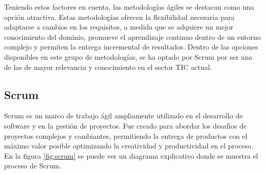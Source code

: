 


Teniendo estos factores en cuenta, las metodologías ágiles se destacan como una opción atractiva. Estas metodologías ofrecen la flexibilidad necesaria para adaptarse a cambios en los requisitos, a medida que se adquiere un mejor conocimiento del dominio, promueve el aprendizaje continuo dentro de un entorno complejo y permiten la entrega incremental de resultados. Dentro de las opciones disponibles en este grupo de metodologías, se ha optado por Scrum \cite{scrum} por ser una de las de mayor relevancia y conocimiento en el sector TIC actual.

\subsection{Scrum}

Scrum es un marco de trabajo ágil ampliamente utilizado en el desarrollo de software y en la gestión de proyectos. Fue creado para abordar los desafíos de proyectos complejos y cambiantes, permitiendo la entrega de productos con el máximo valor posible optimizando la creatividad y productividad en el proceso. En la figura \ref{fig:scrum} se puede ver un diagrama explicativo donde se muestra el proceso de Scrum.

